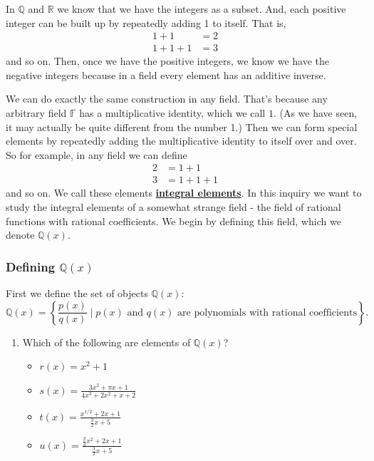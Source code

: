 \documentclass[11pt]{article}
\newenvironment{task}
	{\begin{mdframed}[linecolor=lightgray, linewidth=3pt]\raggedright}
	{\end{mdframed}}
\renewcommand\emph[1]{\underline{\bf{#1}}} %
\theoremstyle{definition}
\begin{document}
\begin{task}
In $\mathbb{Q}$ and $\mathbb{R}$ we know that we have the integers as a subset. And, each positive integer can be built up by repeatedly adding 1 to itself.
That is,
\begin{align*}
  1 + 1 &= 2\\
  1+ 1 + 1 &= 3
\end{align*}
and so on. Then, once we have the positive integers, we know we have the negative integers because in a field every element has an additive inverse. 

We can do exactly the same construction in any field. That's because any arbitrary field $\mathbb{F}$ has a multiplicative identity, which we call $1$. (As we have seen,
it may actually be quite different from the number 1.) Then we can form special elements by repeatedly adding the multiplicative identity to itself over and
over. So for example, in any field we can define
\begin{align*}
  2 &= 1 + 1\\
  3 &= 1 + 1 + 1
\end{align*}
and so on. We call these elements \emph{integral elements}. In this inquiry we want to study the integral elements of a somewhat strange field - the field
of rational functions with rational coefficients. We begin by defining this field, which we denote $\mathbb{Q}(x)$.

\subsubsection{Defining $\mathbb{Q}(x)$}

First we define the set of objects $\mathbb{Q}(x)$:
\[ \mathbb{Q}(x) = \left\{ \frac{p(x)}{q(x)} \mid p(x) \text{ and }q(x)\text{ are polynomials with rational coefficients} \right\}.\]

\begin{enumerate}
  \item Which of the following are elements of $\mathbb{Q}(x)$?
    \begin{itemize}
      \item $r(x) = x^2 + 1$
      \item $s(x) = \frac{3x^2+\pi x + 1}{4x^3 + 2x^2 + x + 2}$
      \item $t(x) = \frac{x^{1/2}+2x + 1}{\frac{3}{2}x+5}$
      \item $u(x) = \frac{\frac{2}{3}x^2+2x + 1}{\frac{3}{2}x+5}$
    \end{itemize}
\end{enumerate}


\end{task}
\end{document}
